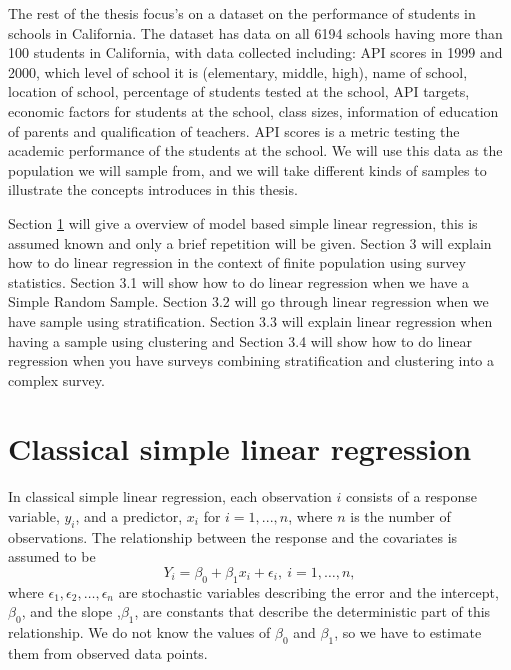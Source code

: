 \documentclass{article}
\begin{document}
The rest of the thesis focus's on a dataset on the performance of students in schools in
California. The dataset has data on all 6194 schools having more than 100
students in California, with data collected
including: API scores in 1999 and 2000, which level of school it is
(elementary, middle, high), name of school, location of school, percentage of
students tested at the school, API targets, economic factors for students at the
school, class sizes, information of education of parents and qualification of teachers.
API scores is a metric testing the academic performance of the students at the school.
We will use this data as the population we will sample from, and we will take
different kinds of samples to illustrate the concepts introduces in this thesis.

Section \ref{sec:modLinReg} will give a overview of model based simple
linear regression, this is assumed known and only a brief repetition will be given.
Section 3 will explain how to do linear regression in the context of finite
population using survey statistics. Section 3.1 will show how to do linear
regression when we have a Simple Random Sample. Section 3.2 will go through
linear regression when we have sample using stratification. Section 3.3 will
explain linear regression when having a sample using clustering and Section 3.4
will show how to do linear regression when you have surveys combining
stratification and clustering into a complex survey.



\section{Classical simple linear regression} \label{sec:modLinReg}

In classical simple linear regression, each observation \(i\) consists of a
response variable, \(y_i\), and a predictor, \(x_i\) for \(i = 1, ..., n\), where \(n\) is the number of observations. The
relationship between the response and the covariates is assumed to be
\begin{equation*}
Y_i = \beta_0 + \beta_1 x_i + \epsilon_i,\ i = 1, \dots, n,
\end{equation*}
where \(\epsilon_1, \epsilon_2, \dots, \epsilon_n\) are stochastic variables
describing the error and the intercept, \(\beta_0\), and the slope ,\(\beta_1\),
are constants that describe the deterministic part of this relationship.
We do not know the values of \(\beta_0\) and \(\beta_1\), so we have to estimate
them from observed data points.
\end{document}
